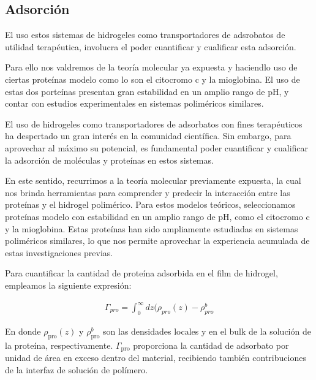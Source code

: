\subsection{Adsorci\'on}\label{sec:film:resu-absorcion}

El uso estos sistemas de hidrogeles como transportadores de adsrobatos de utilidad terap\'eutica, involucra el poder cuantificar y cualificar esta adsorci\'on.
 
Para ello nos valdremos de la teor\'ia molecular ya expuesta y haciendlo uso de ciertas prote\'inas modelo como lo son el citocromo c y la mioglobina. El uso de estas dos porte\'inas presentan gran estabilidad en un amplio rango de pH, y contar con estudios experimentales en sistemas polim\'ericos similares.

El uso de hidrogeles como transportadores de adsorbatos con fines terap\'euticos ha despertado un gran inter\'es en la comunidad cient\'ifica. Sin embargo, para aprovechar al m\'aximo su potencial, es fundamental poder cuantificar y cualificar la adsorci\'on de mol\'eculas y prote\'inas en estos sistemas.

En este sentido, recurrimos a la teor\'ia molecular previamente expuesta, la cual nos brinda herramientas para comprender y predecir la interacci\'on entre las prote\'inas y el hidrogel polim\'erico. Para estos  modelos te\'oricos, seleccionamos prote\'inas modelo con estabilidad en un amplio rango de pH, como el citocromo c y la mioglobina. Estas prote\'inas han sido ampliamente estudiadas en sistemas polim\'ericos similares, lo que nos permite aprovechar la experiencia acumulada de estas investigaciones previas.

Para cuantificar la cantidad de prote\'ina adsorbida en el film de hidrogel, empleamos la siguiente  expresi\'on:

\begin{align}
\Gamma_{pro} = \int^\infty_0 {dz(\rho_{pro}(z) -\rho^b_{pro}}  
\label{eq:film:adsor-exceso}
\end{align}


En donde $\rho_{\text{pro}}(z)$ y $\rho^b_{\text{pro}}$ son las densidades locales y en el bulk de la soluci\'on de la prote\'ina, respectivamente.
$\Gamma_{\text{pro}}$ proporciona la cantidad de adsorbato por unidad de \'area en exceso dentro del material, recibiendo tambi\'en contribuciones de la interfaz de soluci\'on de pol\'imero.

